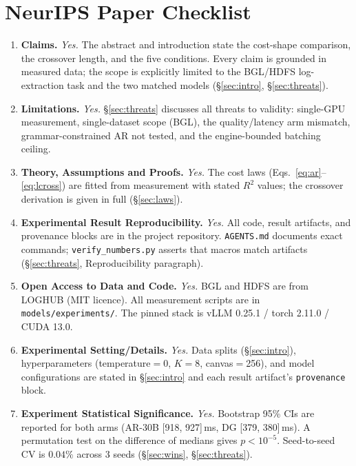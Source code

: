 \section*{NeurIPS Paper Checklist}
\label{app:neurips_checklist}

\begin{enumerate}[leftmargin=2em,label=\arabic*.,itemsep=4pt]

\item \textbf{Claims.}
\emph{Yes.} The abstract and introduction state the cost-shape
comparison, the crossover length, and the five conditions. Every claim
is grounded in measured data; the scope is explicitly limited to the
BGL/HDFS log-extraction task and the two matched models
(\S\ref{sec:intro}, \S\ref{sec:threats}).

\item \textbf{Limitations.}
\emph{Yes.} \S\ref{sec:threats} discusses all threats to validity:
single-GPU measurement, single-dataset scope (BGL), the quality/latency
arm mismatch, grammar-constrained AR not tested, and the engine-bounded
batching ceiling.

\item \textbf{Theory, Assumptions and Proofs.}
\emph{Yes.} The cost laws (Eqs.~\ref{eq:ar}--\ref{eq:lcross}) are
fitted from measurement with stated $R^2$ values; the crossover
derivation is given in full (\S\ref{sec:laws}).

\item \textbf{Experimental Result Reproducibility.}
\emph{Yes.} All code, result artifacts, and provenance blocks are in
the project repository. \texttt{AGENTS.md} documents exact commands;
\texttt{verify\_numbers.py} asserts that macros match artifacts
(\S\ref{sec:threats}, Reproducibility paragraph).

\item \textbf{Open Access to Data and Code.}
\emph{Yes.} BGL and HDFS are from LOGHUB (MIT licence). All measurement
scripts are in \texttt{models/experiments/}. The pinned stack is
vLLM 0.25.1 / torch 2.11.0 / CUDA 13.0.

\item \textbf{Experimental Setting/Details.}
\emph{Yes.} Data splits (\S\ref{sec:intro}), hyperparameters
(temperature$=$0, $K{=}8$, canvas$=$256), and model configurations are
stated in \S\ref{sec:intro} and each result artifact's
\texttt{provenance} block.

\item \textbf{Experiment Statistical Significance.}
\emph{Yes.} Bootstrap 95\% CIs are reported for both arms (AR-30B
[918, 927]\,ms, DG [379, 380]\,ms). A permutation test on the
difference of medians gives $p < 10^{-5}$. Seed-to-seed CV is
$0.04\%$ across 3 seeds (\S\ref{sec:wins}, \S\ref{sec:threats}).


\end{enumerate}
